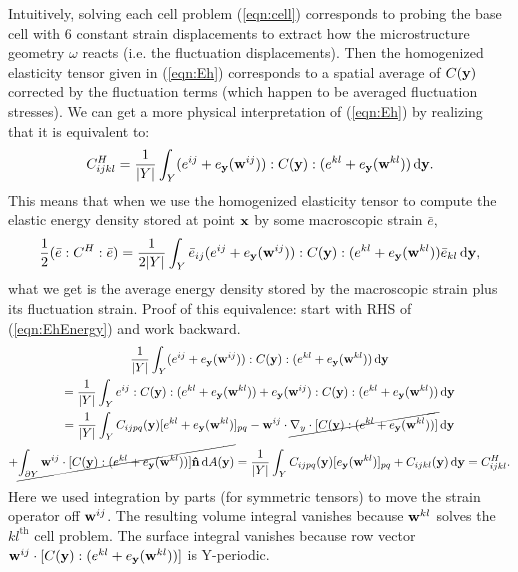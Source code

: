 \documentclass[10pt]{article}
\begin{document}
Intuitively, solving each cell problem (\ref{eqn:cell}) corresponds to probing
the base cell with 6 constant strain displacements to extract how the
microstructure geometry $\omega$ reacts (i.e. the fluctuation displacements).
Then the homogenized elasticity tensor given in (\ref{eqn:Eh}) corresponds to a
spatial average of $C({\bf y})$ corrected by the fluctuation terms (which
happen to be averaged fluctuation stresses). We can get a more physical
interpretation of (\ref{eqn:Eh}) by realizing that it is equivalent to:
\begin{equation}
    \label{eqn:EhEnergy}
    C^H_{ijkl} = \frac{1}{|Y|} \int_Y (e^{ij} + e_{\bf y}({\bf w}^{ij})) : C({\bf y}) : (e^{kl} + e_{\bf y}({\bf w}^{kl})) \, \mathrm{d} {\bf y}.
\end{equation}
This means that when we use the homogenized elasticity tensor to compute the
elastic energy density stored at point ${\bf x}$ by some macroscopic strain
$\bar{e}$,
$$
\frac{1}{2} (\bar{e} : C^H :\bar{e}) =
\frac{1}{2|Y|} \int_Y \bar{e}_{ij} (e^{ij} + e_{\bf y}({\bf w}^{ij})) : C({\bf y}) : (e^{kl} + e_{\bf y}({\bf w}^{kl})) \bar{e}_{kl} \, \mathrm{d} {\bf y},
$$
what we get is the average energy density stored by the macroscopic strain plus
its fluctuation strain. Proof of this equivalence: start with RHS of
(\ref{eqn:EhEnergy}) and work backward.
\begin{gather*}
\frac{1}{|Y|} \int_Y (e^{ij} + e_{\bf y}({\bf w}^{ij})) : C({\bf y}) : (e^{kl} + e_{\bf y}({\bf w}^{kl})) \, \mathrm{d} {\bf y} \\
= \frac{1}{|Y|} \int_Y e^{ij} : C({\bf y}) : (e^{kl} + e_{\bf y}({\bf w}^{kl})) +
    e_{\bf y}({\bf w}^{ij}) : C({\bf y}) : (e^{kl} + e_{\bf y}({\bf w}^{kl})) \, \mathrm{d} {\bf y} \\
    = \frac{1}{|Y|} \int_Y C_{ijpq}({\bf y}) [e^{kl} + e_{\bf y}({\bf w}^{kl})]_{pq} -
{{\bf w}}^{ij} \cdot \cancel{\nabla_y \cdot [C({\bf y}) : (e^{kl} + e_{\bf y}({\bf w}^{kl}))]} \, \mathrm{d} {\bf y} \\
+ \cancel{\int_{\partial Y} {\bf w}^{ij} \cdot [C({\bf y}) : (e^{kl} + e_{\bf y}({\bf w}^{kl}))] {\bf \hat{n}} \, \mathrm{d} A({\bf y})}
= \frac{1}{|Y|} \int_Y C_{ijpq}({\bf y}) [e_{\bf y}({\bf w}^{kl})]_{pq} + C_{ijkl}({\bf y}) \, \mathrm{d} {\bf y} = C^H_{ijkl}.
\end{gather*}
Here we used integration by parts (for symmetric tensors) to move the strain
operator off ${\bf w}^{ij}$. The resulting volume integral vanishes because ${\bf
w}^{kl}$ solves the $kl^\text{th}$ cell problem. The surface integral vanishes
because row vector ${\bf w}^{ij} \cdot [C({\bf y}) : (e^{kl} + e_{\bf
y}({\bf w}^{kl}))]$ is Y-periodic.
\end{document}
